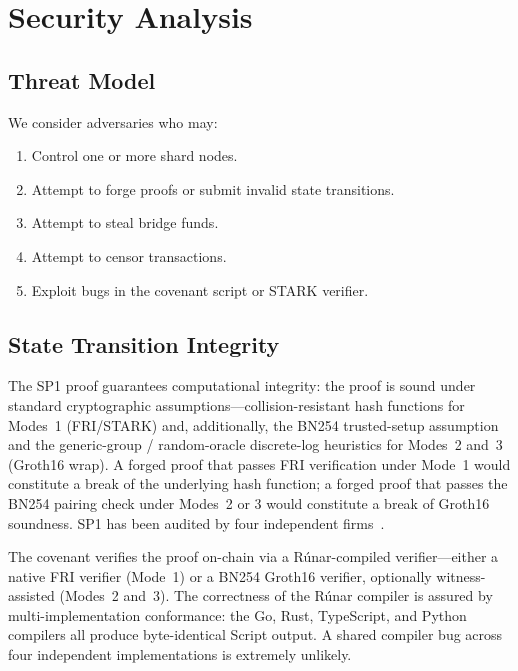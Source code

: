\documentclass[11pt,twocolumn]{article}
\begin{document}
\section{Security Analysis}
\label{sec:security}

\subsection{Threat Model}

We consider adversaries who may:

\begin{enumerate}[nosep,leftmargin=1.5em]
\item Control one or more shard nodes.
\item Attempt to forge proofs or submit invalid state transitions.
\item Attempt to steal bridge funds.
\item Attempt to censor transactions.
\item Exploit bugs in the covenant script or STARK verifier.
\end{enumerate}

\subsection{State Transition Integrity}

The SP1 proof guarantees computational integrity: the proof is sound under standard cryptographic assumptions---collision-resistant hash functions for Modes~1 (FRI/STARK) and, additionally, the BN254 trusted-setup assumption and the generic-group / random-oracle discrete-log heuristics for Modes~2 and~3 (Groth16 wrap). A forged proof that passes FRI verification under Mode~1 would constitute a break of the underlying hash function; a forged proof that passes the BN254 pairing check under Modes~2 or 3 would constitute a break of Groth16 soundness. SP1 has been audited by four independent firms~\cite{sp1}.

The covenant verifies the proof on-chain via a R\'{u}nar-compiled verifier---either a native FRI verifier (Mode~1) or a BN254 Groth16 verifier, optionally witness-assisted (Modes~2 and~3). The correctness of the R\'{u}nar compiler is assured by multi-implementation conformance: the Go, Rust, TypeScript, and Python compilers all produce byte-identical Script output. A shared compiler bug across four independent implementations is extremely unlikely.
\end{document}
